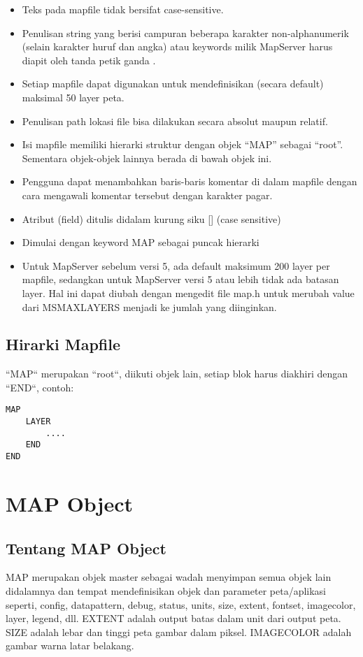 \begin{itemize}
	\item Teks pada mapfile tidak bersifat case-sensitive.
	\item Penulisan string yang berisi campuran beberapa karakter non-alphanumerik (selain karakter huruf dan angka) atau keywords milik MapServer harus diapit oleh tanda petik ganda .
	\item Setiap mapfile dapat digunakan untuk mendefinisikan (secara default) maksimal 50 layer peta.
	\item Penulisan path lokasi file bisa dilakukan secara absolut maupun relatif.
	\item Isi mapfile memiliki hierarki struktur dengan objek “MAP” sebagai “root”. Sementara objek-objek lainnya berada di bawah objek ini.
	\item Pengguna dapat menambahkan baris-baris komentar di dalam mapfile dengan cara mengawali komentar tersebut dengan karakter pagar.
	\item Atribut (field) ditulis didalam kurung siku [] (case sensitive)
	\item Dimulai dengan keyword MAP sebagai puncak hierarki
	\item Untuk MapServer sebelum versi 5, ada default maksimum 200 layer per mapfile, 
	      sedangkan untuk MapServer versi 5 atau lebih tidak ada batasan layer. 
              Hal ini dapat diubah dengan mengedit file map.h untuk merubah value dari MSMAXLAYERS menjadi ke jumlah yang diinginkan.	
\end{itemize}

\subsection{Hirarki Mapfile}
``MAP`` merupakan ``root``, diikuti objek lain, setiap blok harus diakhiri dengan ``END``, 
contoh:
\begin{verbatim}
MAP
	LAYER
		....
	END
END
\end{verbatim}


\section{MAP Object}
\subsection{Tentang MAP Object}
MAP merupakan objek master sebagai wadah menyimpan semua objek lain didalamnya dan tempat mendefinisikan objek dan parameter 
peta/aplikasi seperti, config, datapattern, debug, status, units, size, extent, fontset, imagecolor, layer, legend, dll.
EXTENT adalah output batas dalam unit dari output peta.
SIZE adalah  lebar dan tinggi peta gambar dalam piksel.
IMAGECOLOR adalah gambar warna latar belakang.

